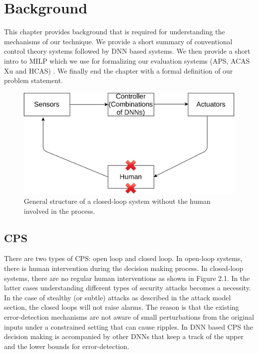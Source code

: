 \chapter{Background}
\label{ch:Chapter2}




This chapter provides background that is required for understanding the mechanisms of our technique. We provide a short summary of conventional control theory systems followed by DNN based systems. We then provide a short intro to \ac{MILP} which we use for formalizing our evaluation systems (APS, ACAS Xu and HCAS) . We finally end the chapter with a formal definition of our problem statement. 

\begin{figure}
	\centering
	\includegraphics[width=0.7\linewidth]{Images/Systemsdescription}
	\caption[Closed-loop system]{General structure of a closed-loop system without the human involved in the process.}
	\label{fig:systemsdescription}
\end{figure}

\section{\ac{CPS}}
There are two types of CPS: open loop and closed loop. In open-loop systems, there is human intervention during the decision making process. In closed-loop systems, there are no regular human interventions as shown in Figure 2.1. In the latter cases understanding different types of security attacks becomes a necessity. In the case of stealthy (or subtle) attacks as described in the attack model section, the closed loops will not raise alarms. The reason is that the existing error-detection mechanisms are not aware of small perturbations from the original inputs under a constrained setting that can cause ripples. In DNN based CPS the decision making is accompanied by other DNNs that keep a track of the upper and the lower bounds for error-detection. 

